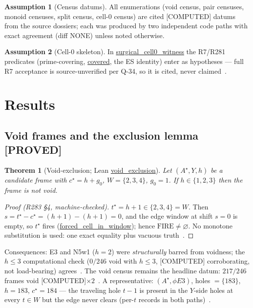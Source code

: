 \documentclass[11pt,a4paper]{article}
\newtheorem{theorem}{Theorem}
\theoremstyle{definition}
\newtheorem{assumption}{Assumption}
\begin{document}
\begin{assumption}[Census datums]
  \label{asm:census}
  All enumerations (void census, pair censuses, monoid censuses, split
  census, cell-0 census) are cited [COMPUTED] datums from the source
  dossiers; each was produced by two independent code paths with exact
  agreement (diff NONE) unless noted otherwise.
\end{assumption}

\begin{assumption}[Cell-0 skeleton]
  \label{asm:cell0}
  In \url{surgical_cell0_witness} the R7/R281 predicates
  (prime-covering, \url{covered}, the ES identity) enter as hypotheses
  — full R7 acceptance is source-unverified per Q-34, so it is cited,
  never claimed~\cite{D289,D314}.
\end{assumption}

\section{Results}
\label{sec:results}

\subsection{Void frames and the exclusion lemma [PROVED]}

\begin{theorem}[Void-exclusion; Lean \url{void_exclusion}]
  \label{thm:exclusion}
  Let $(A^\star,Y,h)$ be a candidate frame with $c^\star=h+g_0$,
  $W=\{2,3,4\}$, $g_0=1$. If $h\in\{1,2,3\}$ then the frame is not void.
\end{theorem}

\begin{proof}[Proof (R283 §4, machine-checked)]
$t^\star=h+1\in\{2,3,4\}=W$. Then $s=t^\star-c^\star=(h+1)-(h+1)=0$,
and the edge window at shift $s=0$ is empty, so $t^\star$ fires
(\url{forced_cell_in_window}); hence
$\mathrm{FIRE}\ne\varnothing$. No monotone substitution is used: one
exact equality plus vacuous truth~\cite{D283}.
\end{proof}

Consequences: E3 and N5w1 ($h=2$) were \emph{structurally} barred from
voidness; the $h\le3$ computational check ($0/246$ void with $h\le3$,
[COMPUTED] corroborating, not load-bearing) agrees~\cite{D283}. The void
census remains the headline datum: $217/246$ frames void
[COMPUTED]$\times2$~\cite{D283}. A representative: $(A^\star,\phi E3)$,
holes $=\{183\}$, $h=183$, $c^\star=184$ — the traveling hole $t-1$ is
present in the $Y$-side holes at every $t\in W$ but the edge never
clears (per-$t$ records in both paths)~\cite{D283}.
\end{document}
